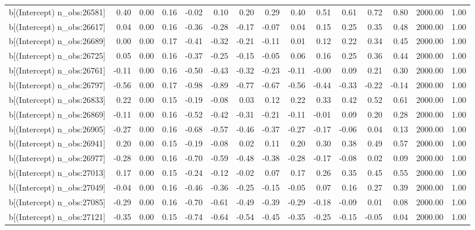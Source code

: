 \begin{table}[ht]
\begin{tabular}{rrrrrrrrrrrrrrr}
  b[(Intercept) n\_obs:26581] & 0.40 & 0.00 & 0.16 & -0.02 & 0.10 & 0.20 & 0.29 & 0.40 & 0.51 & 0.61 & 0.72 & 0.80 & 2000.00 & 1.00 \\ 
  b[(Intercept) n\_obs:26617] & 0.04 & 0.00 & 0.16 & -0.36 & -0.28 & -0.17 & -0.07 & 0.04 & 0.15 & 0.25 & 0.35 & 0.48 & 2000.00 & 1.00 \\ 
  b[(Intercept) n\_obs:26689] & 0.00 & 0.00 & 0.17 & -0.41 & -0.32 & -0.21 & -0.11 & 0.01 & 0.12 & 0.22 & 0.34 & 0.45 & 2000.00 & 1.00 \\ 
  b[(Intercept) n\_obs:26725] & 0.05 & 0.00 & 0.16 & -0.37 & -0.25 & -0.15 & -0.05 & 0.06 & 0.16 & 0.25 & 0.36 & 0.44 & 2000.00 & 1.00 \\ 
  b[(Intercept) n\_obs:26761] & -0.11 & 0.00 & 0.16 & -0.50 & -0.43 & -0.32 & -0.23 & -0.11 & -0.00 & 0.09 & 0.21 & 0.30 & 2000.00 & 1.00 \\ 
  b[(Intercept) n\_obs:26797] & -0.56 & 0.00 & 0.17 & -0.98 & -0.89 & -0.77 & -0.67 & -0.56 & -0.44 & -0.33 & -0.22 & -0.14 & 2000.00 & 1.00 \\ 
  b[(Intercept) n\_obs:26833] & 0.22 & 0.00 & 0.15 & -0.19 & -0.08 & 0.03 & 0.12 & 0.22 & 0.33 & 0.42 & 0.52 & 0.61 & 2000.00 & 1.00 \\ 
  b[(Intercept) n\_obs:26869] & -0.11 & 0.00 & 0.16 & -0.52 & -0.42 & -0.31 & -0.21 & -0.11 & -0.01 & 0.09 & 0.20 & 0.28 & 2000.00 & 1.00 \\ 
  b[(Intercept) n\_obs:26905] & -0.27 & 0.00 & 0.16 & -0.68 & -0.57 & -0.46 & -0.37 & -0.27 & -0.17 & -0.06 & 0.04 & 0.13 & 2000.00 & 1.00 \\ 
  b[(Intercept) n\_obs:26941] & 0.20 & 0.00 & 0.15 & -0.19 & -0.08 & 0.02 & 0.11 & 0.20 & 0.30 & 0.38 & 0.49 & 0.57 & 2000.00 & 1.00 \\ 
  b[(Intercept) n\_obs:26977] & -0.28 & 0.00 & 0.16 & -0.70 & -0.59 & -0.48 & -0.38 & -0.28 & -0.17 & -0.08 & 0.02 & 0.09 & 2000.00 & 1.00 \\ 
  b[(Intercept) n\_obs:27013] & 0.17 & 0.00 & 0.15 & -0.24 & -0.12 & -0.02 & 0.07 & 0.17 & 0.26 & 0.35 & 0.45 & 0.55 & 2000.00 & 1.00 \\ 
  b[(Intercept) n\_obs:27049] & -0.04 & 0.00 & 0.16 & -0.46 & -0.36 & -0.25 & -0.15 & -0.05 & 0.07 & 0.16 & 0.27 & 0.39 & 2000.00 & 1.00 \\ 
  b[(Intercept) n\_obs:27085] & -0.29 & 0.00 & 0.16 & -0.70 & -0.61 & -0.49 & -0.39 & -0.29 & -0.18 & -0.09 & 0.01 & 0.08 & 2000.00 & 1.00 \\ 
  b[(Intercept) n\_obs:27121] & -0.35 & 0.00 & 0.15 & -0.74 & -0.64 & -0.54 & -0.45 & -0.35 & -0.25 & -0.15 & -0.05 & 0.04 & 2000.00 & 1.00 \\ 

\end{tabular}
\end{table}

